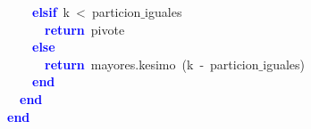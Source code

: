 \mbox{}\ \ \ \ \textbf{\textcolor{Blue}{elsif}}\ k\ \textcolor{BrickRed}{\textless{}}\ particion$\_$iguales \\
\mbox{}\ \ \ \ \ \ \textbf{\textcolor{Blue}{return}}\ pivote \\
\mbox{}\ \ \ \ \textbf{\textcolor{Blue}{else}} \\
\mbox{}\ \ \ \ \ \ \textbf{\textcolor{Blue}{return}}\ mayores\textcolor{BrickRed}{.}kesimo\ \textcolor{BrickRed}{(}k\ \textcolor{BrickRed}{-}\ particion$\_$iguales\textcolor{BrickRed}{)} \\
\mbox{}\ \ \ \ \textbf{\textcolor{Blue}{end}} \\
\mbox{}\ \ \textbf{\textcolor{Blue}{end}} \\
\mbox{}\textbf{\textcolor{Blue}{end}} \\
\mbox{}

